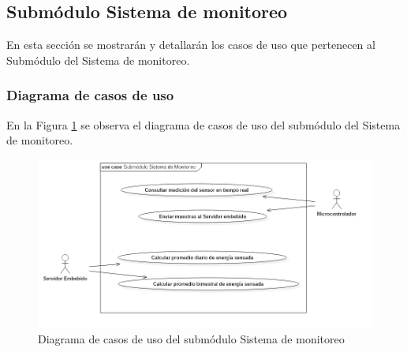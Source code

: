 \subsection{Submódulo Sistema de monitoreo}
En esta sección se mostrarán y detallarán los casos de uso que pertenecen al Submódulo del Sistema de monitoreo.
\subsubsection{Diagrama de casos de uso}
En la Figura \ref{fig:dcu-moduloMonitoreo} se observa el diagrama de casos de uso del submódulo del Sistema de monitoreo.
\begin{figure}[H]
	\centering
	\includegraphics[scale=.6]{Capitulo4/software/submodulos/mediciones/images/dcuSubMonitoreo.png}
	\caption{Diagrama de casos de uso del submódulo Sistema de monitoreo}
	\label{fig:dcu-moduloMonitoreo}
\end{figure}





